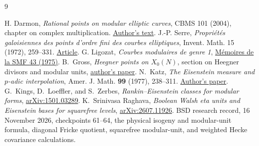 \documentclass[11pt]{article}
\begin{document}
\begin{thebibliography}{9}\raggedright
{} H. Darmon, \emph{Rational points on modular elliptic curves}, CBMS 101 (2004), chapter on complex multiplication. \href{https://math.mcgill.ca/darmon/pub/Articles/Research/36.NSF-CBMS/chapter.pdf}{Author's text}.
 J.-P. Serre, \emph{Propri\'et\'es galoisiennes des points d'ordre fini des courbes elliptiques}, Invent. Math. 15 (1972), 259--331. \href{https://doi.org/10.1007/BF01405086}{Article}.
 G. Ligozat, \emph{Courbes modulaires de genre 1}, \href{https://www.numdam.org/item/MSMF_1975__43__5_0/}{M\'emoires de la SMF 43 (1975)}.
 B.~Gross, \emph{Heegner points on $X_0(N)$}, section
on Heegner divisors and modular units,
\href{https://wstein.org/misc/sagedays18_papers/gross-heegner_points_on_X0N.pdf}{author's paper}.
 N.~Katz, \emph{The Eisenstein measure and $p$-adic interpolation},
Amer. J. Math. \textbf{99} (1977), 238--311.
\href{https://web.math.princeton.edu/~nmk/old/eismeasure.pdf}{Author's paper}.
 G.~Kings, D.~Loeffler, and S.~Zerbes,
\emph{Rankin--Eisenstein classes for modular forms},
\href{https://arxiv.org/abs/1501.03289}{arXiv:1501.03289}.
 K.~Srinivasa Raghava,
\emph{Boolean Walsh eta units and Eisenstein bases for squarefree levels},
\href{https://arxiv.org/abs/2607.11926}{arXiv:2607.11926}.
 BSD research record, 16 November 2026, checkpoints
61--64, the physical isogeny and modular-unit formula, diagonal
Fricke quotient, squarefree modular-unit, and weighted Hecke
covariance calculations.
\end{thebibliography}
\end{document}
